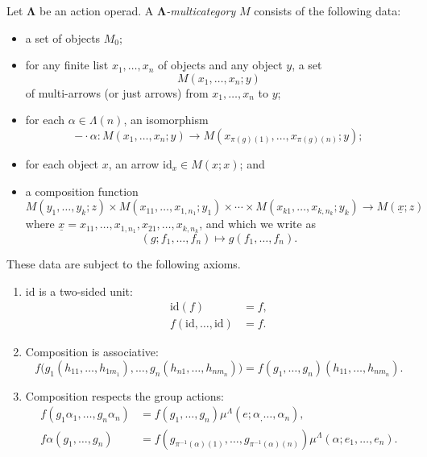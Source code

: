 \documentclass{amsbook} %
\newcommand{\mb}{\mathbf}
\newcommand{\id}{\textrm{id}}
\numberwithin{section}{chapter}
\begin{document}
\begin{Defi}\label{lambda_multicat}
Let $\mb{\Lambda}$ be an action operad.  A \emph{$\mb{\Lambda}$-multicategory} $M$ consists of the following data:
\begin{itemize}
\item a set of objects $M_{0}$;
\item for any finite list $x_{1}, \ldots, x_{n}$ of objects and any object $y$, a set
\[
M(x_{1}, \ldots, x_{n}; y)
\]
of multi-arrows (or just arrows) from $x_{1}, \ldots, x_{n}$ to $y$;
\item for each $\alpha \in \Lambda(n)$, an isomorphism
\[
-\cdot \alpha \colon M(x_{1}, \ldots, x_{n}; y) \rightarrow M(x_{\pi(g)(1)}, \ldots, x_{\pi(g)(n)}; y);
\]
\item for each object $x$, an arrow $\id_{x} \in M(x;x)$; and
\item a composition function
\[
M(y_{1}, \ldots, y_{k}; z) \times M(x_{11}, \ldots, x_{1,n_{1}}; y_{1}) \times \cdots \times M(x_{k1}, \ldots, x_{k,n_{k}}; y_{k}) \rightarrow M(\underline{x}; z)
\]
where $\underline{x} = x_{11}, \ldots, x_{1,n_{1}}, x_{21}, \ldots, x_{k,n_{k}}$, and which we write as
\[
(g; f_{1}, \ldots, f_{n}) \mapsto g(f_{1}, \ldots, f_{n}).
\]
\end{itemize}
These data are subject to the following axioms.
\begin{enumerate}
\item $\id$ is a two-sided unit:
\begin{align*}
  \id(f) &= f, \\
  f(\id,\ldots,\id) &= f.
\end{align*}
\item Composition is associative:
\[
f\Big( g_{1}(h_{11}, \ldots, h_{1m_{1}}), \ldots, g_{n}(h_{n1}, \ldots, h_{nm_{n}}) \Big) = f(g_{1}, \ldots, g_{n})(h_{11}, \ldots, h_{nm_{n}}).
\]
\item Composition respects the group actions:
\begin{align*}
  f(g_1\alpha_1,\ldots, g_n\alpha_n) &= f(g_1,\ldots,g_n)\mu^{\Lambda}(e;\alpha_,\ldots,\alpha_n), \\
  f\alpha(g_1,\ldots,g_n) &= f\left(g_{\pi^{-1}(\alpha)(1)},\ldots,g_{\pi^{-1}(\alpha)(n)}\right)\mu^{\Lambda}(\alpha;e_1,\ldots,e_n).
\end{align*}
\end{enumerate}
\end{Defi}
\end{document}
